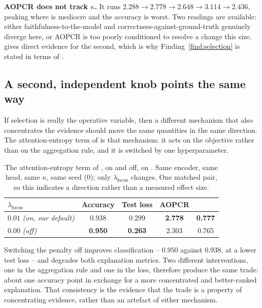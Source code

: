 \textbf{AOPCR does not track $\kappa$.} It runs $2.288 \to 2.778 \to 2.648 \to 3.114 \to 2.436$,
peaking where \ndcg{} is mediocre and the accuracy is worst. Two readings are available: either
faithfulness-to-the-model and correctness-against-ground-truth genuinely diverge here, or AOPCR is
too poorly conditioned to resolve a change this size.  gives direct evidence for the
second, which is why Finding~\ref{find:selection} is stated in terms of \ndcg{}.

\subsection{A second, independent knob points the same way}
\label{sec:selection:entropy}

If selection is really the operative variable, then a different mechanism that also concentrates the
evidence should move the same quantities in the same direction. The attention-entropy term of
 is that mechanism: it acts on the objective rather than on the aggregation rule, and
it is switched by one hyperparameter.

\begin{table}[t]
\caption{The attention-entropy term of , on and off, on \webtraffic{}. Same encoder,
same head, same $\kappa$, same seed ($0$); only $\lambda_{\mathrm{focus}}$ changes. One matched pair,
so this indicates a direction rather than a measured effect size.}
\label{tab:entropy}
\begin{center}
\small
\begin{tabular}{lcccc}
\toprule
\textbf{$\lambda_{\mathrm{focus}}$} & \textbf{Accuracy} & \textbf{Test loss} & \textbf{AOPCR} & \textbf{\ndcg{}} \\
\midrule
$0.01$ \emph{(on, our default)} & 0.938 & 0.299 & \textbf{2.778} & \textbf{0.777} \\
$0.00$ \emph{(off)}             & \textbf{0.950} & \textbf{0.263} & 2.303 & 0.765 \\
\bottomrule
\end{tabular}
\end{center}
\end{table}

Switching the penalty off improves classification -- $0.950$ against $0.938$, at a lower test loss --
and degrades both explanation metrics. Two different interventions, one in the aggregation rule and
one in the loss, therefore produce the same trade: about one accuracy point in exchange for a more
concentrated and better-ranked explanation. That consistency is the evidence that the trade is a
property of concentrating evidence, rather than an artefact of either mechanism.

